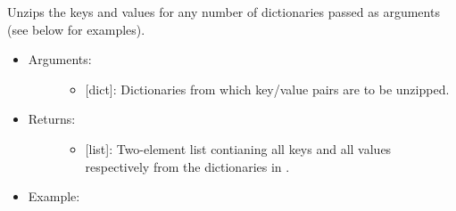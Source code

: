 \documentclass[letterpaper,10pt,english]{sphinxmanual}
\begin{document}
\begin{fulllineitems}
\label{\detokenize{iterables:data_tools.iterables.unzip_dicts}}
Unzips the keys and values for any number of dictionaries passed as
arguments (see below for examples).
\begin{itemize}
\item {} \begin{description}
\item[{Arguments:}] \leavevmode\begin{itemize}
\item {} 
 {[}dict{]}: Dictionaries from which key/value pairs are
to be unzipped.

\end{itemize}

\end{description}

\item {} \begin{description}
\item[{Returns:}] \leavevmode\begin{itemize}
\item {} 
{[}list{]}: Two-element list contianing all keys and all values
respectively from the dictionaries in .

\end{itemize}

\end{description}

\item {} \begin{description}
\item[{Example:}] \leavevmode
{}%
\begin{sphinxVerbatim}[commandchars=\\\{\}]
  \PYG{p}{[}   \PYG{p}{]}
  \PYG{p}{[}   \PYG{p}{]}
 
\end{sphinxVerbatim}


\end{description}
\end{itemize}
\end{fulllineitems}
\end{document}
